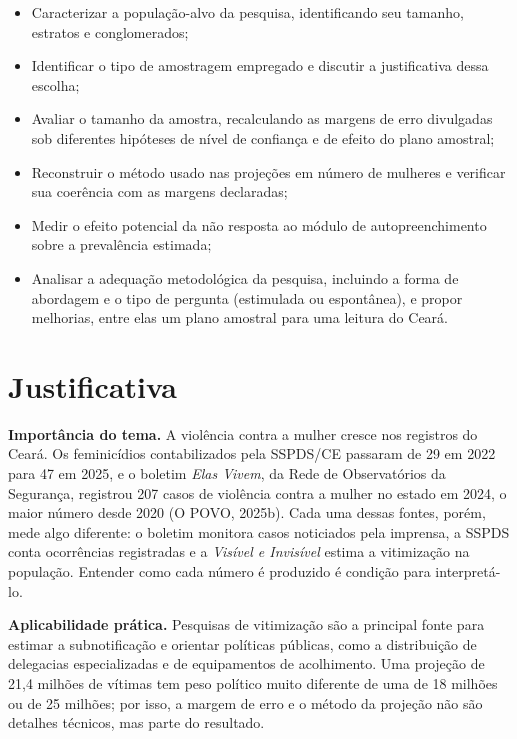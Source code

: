 \documentclass[12pt,a4paper]{article}
\begin{document}
\begin{itemize}
    \item Caracterizar a população-alvo da pesquisa, identificando seu tamanho, estratos e conglomerados;
    \item Identificar o tipo de amostragem empregado e discutir a justificativa dessa escolha;
    \item Avaliar o tamanho da amostra, recalculando as margens de erro divulgadas sob diferentes hipóteses de nível de confiança e de efeito do plano amostral;
    \item Reconstruir o método usado nas projeções em número de mulheres e verificar sua coerência com as margens declaradas;
    \item Medir o efeito potencial da não resposta ao módulo de autopreenchimento sobre a prevalência estimada;
    \item Analisar a adequação metodológica da pesquisa, incluindo a forma de abordagem e o tipo de pergunta (estimulada ou espontânea), e propor melhorias, entre elas um plano amostral para uma leitura do Ceará.
\end{itemize}

\newpage

\section{Justificativa}

\textbf{Importância do tema.} A violência contra a mulher cresce nos registros do Ceará. Os feminicídios contabilizados pela SSPDS/CE passaram de 29 em 2022 para 47 em 2025, e o boletim \textit{Elas Vivem}, da Rede de Observatórios da Segurança, registrou 207 casos de violência contra a mulher no estado em 2024, o maior número desde 2020 (O POVO, 2025b). Cada uma dessas fontes, porém, mede algo diferente: o boletim monitora casos noticiados pela imprensa, a SSPDS conta ocorrências registradas e a \textit{Visível e Invisível} estima a vitimização na população. Entender como cada número é produzido é condição para interpretá-lo.

\textbf{Aplicabilidade prática.} Pesquisas de vitimização são a principal fonte para estimar a subnotificação e orientar políticas públicas, como a distribuição de delegacias especializadas e de equipamentos de acolhimento. Uma projeção de 21,4 milhões de vítimas tem peso político muito diferente de uma de 18 milhões ou de 25 milhões; por isso, a margem de erro e o método da projeção não são detalhes técnicos, mas parte do resultado.
\end{document}
